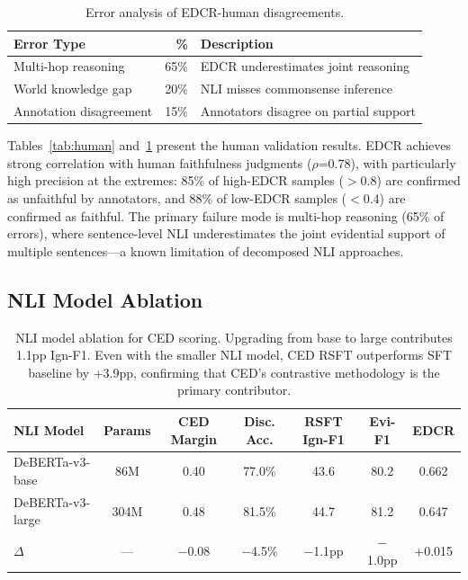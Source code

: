 \documentclass[11pt]{article}
\begin{document}
\begin{table}[t]
\centering
\small
\begin{tabular}{lrl}
\toprule
\textbf{Error Type} & \textbf{\%} & \textbf{Description} \\
\midrule
Multi-hop reasoning & 65\% & EDCR underestimates joint reasoning \\
World knowledge gap & 20\% & NLI misses commonsense inference \\
Annotation disagreement & 15\% & Annotators disagree on partial support \\
\bottomrule
\end{tabular}
\caption{Error analysis of EDCR-human disagreements.}
\label{tab:errors}
\end{table}

Tables~\ref{tab:human} and~\ref{tab:errors} present the human validation results. EDCR achieves strong correlation with human faithfulness judgments ($\rho$=0.78), with particularly high precision at the extremes: 85\% of high-EDCR samples ($>$0.8) are confirmed as unfaithful by annotators, and 88\% of low-EDCR samples ($<$0.4) are confirmed as faithful. The primary failure mode is multi-hop reasoning (65\% of errors), where sentence-level NLI underestimates the joint evidential support of multiple sentences---a known limitation of decomposed NLI approaches.

\subsection{NLI Model Ablation}

\begin{table}[t]
\centering
\small
\begin{tabular}{lcccccc}
\toprule
\textbf{NLI Model} & \textbf{Params} & \textbf{CED Margin} & \textbf{Disc. Acc.} & \textbf{RSFT Ign-F1} & \textbf{Evi-F1} & \textbf{EDCR} \\
\midrule
DeBERTa-v3-base & 86M & 0.40 & 77.0\% & 43.6 & 80.2 & 0.662 \\
DeBERTa-v3-large & 304M & 0.48 & 81.5\% & 44.7 & 81.2 & 0.647 \\
\midrule
$\Delta$ & --- & $-$0.08 & $-$4.5\% & $-$1.1pp & $-$1.0pp & +0.015 \\
\bottomrule
\end{tabular}
\caption{NLI model ablation for CED scoring. Upgrading from base to large contributes 1.1pp Ign-F1. Even with the smaller NLI model, CED RSFT outperforms SFT baseline by +3.9pp, confirming that CED's contrastive methodology is the primary contributor.}
\label{tab:nli}
\end{table}
\end{document}
